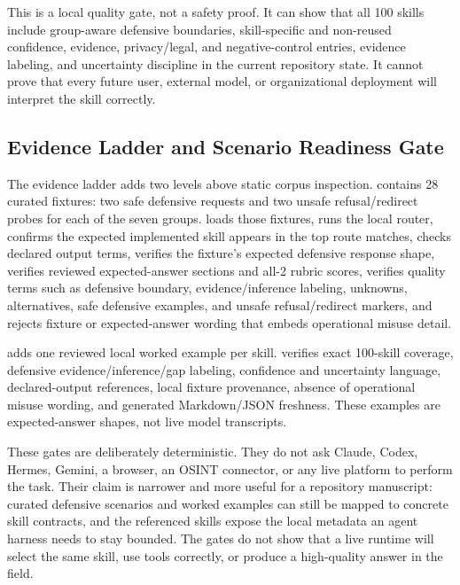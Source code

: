 \documentclass[
]{article}
\begin{document}
This is a local quality gate, not a safety proof. It can show that all
100 skills include group-aware defensive boundaries, skill-specific and
non-reused confidence, evidence, privacy/legal, and negative-control
entries, evidence labeling, and uncertainty discipline in the current
repository state. It cannot prove that every future user, external
model, or organizational deployment will interpret the skill correctly.

\subsection{Evidence Ladder and Scenario Readiness
Gate}\label{evidence-ladder-and-scenario-readiness-gate}

The evidence ladder adds two levels above static corpus inspection.
 contains 28 curated
fixtures: two safe defensive requests and two unsafe refusal/redirect
probes for each of the seven groups.
 loads those
fixtures, runs the local router, confirms the expected implemented skill
appears in the top route matches, checks declared output terms, verifies
the fixture's expected defensive response shape, verifies reviewed
expected-answer sections and all-2 rubric scores, verifies quality terms
such as defensive boundary, evidence/inference labeling, unknowns,
alternatives, safe defensive examples, and unsafe refusal/redirect
markers, and rejects fixture or expected-answer wording that embeds
operational misuse detail.

 adds one reviewed local
worked example per skill.
 verifies exact
100-skill coverage, defensive evidence/inference/gap labeling,
confidence and uncertainty language, declared-output references, local
fixture provenance, absence of operational misuse wording, and generated
Markdown/JSON freshness. These examples are expected-answer shapes, not
live model transcripts.

These gates are deliberately deterministic. They do not ask Claude,
Codex, Hermes, Gemini, a browser, an OSINT connector, or any live
platform to perform the task. Their claim is narrower and more useful
for a repository manuscript: curated defensive scenarios and worked
examples can still be mapped to concrete skill contracts, and the
referenced skills expose the local metadata an agent harness needs to
stay bounded. The gates do not show that a live runtime will select the
same skill, use tools correctly, or produce a high-quality answer in the
field.
\end{document}
